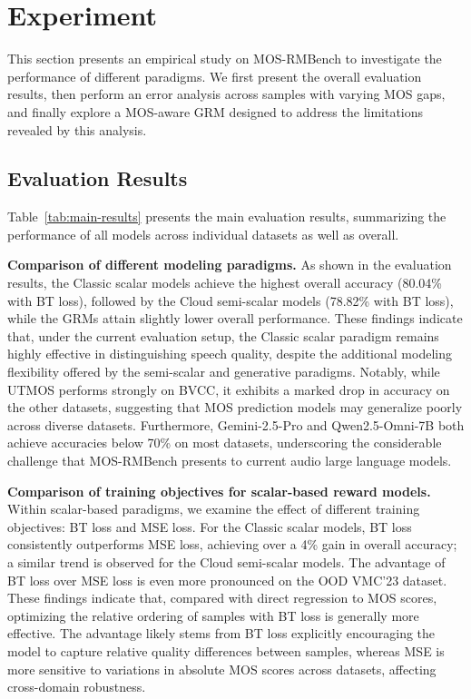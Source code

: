 \section{Experiment}
This section presents an empirical study on MOS-RMBench to investigate the performance of different paradigms. We first present the overall evaluation results, then perform an error analysis across samples with varying MOS gaps, and finally explore a MOS-aware GRM designed to address the limitations revealed by this analysis.



\subsection{Evaluation Results}
Table~\ref{tab:main-results} presents the main evaluation results, summarizing the performance of all models across individual datasets as well as overall.

\textbf{Comparison of different modeling paradigms.}
As shown in the evaluation results, the Classic scalar models achieve the highest overall accuracy (80.04\% with BT loss), followed by the Cloud semi-scalar models (78.82\% with BT loss), while the GRMs attain slightly lower overall performance. These findings indicate that, under the current evaluation setup, the Classic scalar paradigm remains highly effective in distinguishing speech quality, despite the additional modeling flexibility offered by the semi-scalar and generative paradigms.
Notably, while UTMOS performs strongly on BVCC, it exhibits a marked drop in accuracy on the other datasets, suggesting that MOS prediction models may generalize poorly across diverse datasets. 
Furthermore, Gemini-2.5-Pro and Qwen2.5-Omni-7B both achieve accuracies below 70\% on most datasets, underscoring the considerable challenge that MOS-RMBench presents to current audio large language models.

\textbf{Comparison of training objectives for scalar-based reward models.}
Within scalar-based paradigms, we examine the effect of different training objectives: BT loss and MSE loss. For the Classic scalar models, BT loss consistently outperforms MSE loss, achieving over a 4\% gain in overall accuracy; a similar trend is observed for the Cloud semi-scalar models. The advantage of BT loss over MSE loss is even more pronounced on the OOD VMC'23 dataset. These findings indicate that, compared with direct regression to MOS scores, optimizing the relative ordering of samples with BT loss is generally more effective. The advantage likely stems from BT loss explicitly encouraging the model to capture relative quality differences between samples, whereas MSE is more sensitive to variations in absolute MOS scores across datasets, affecting cross-domain robustness.

